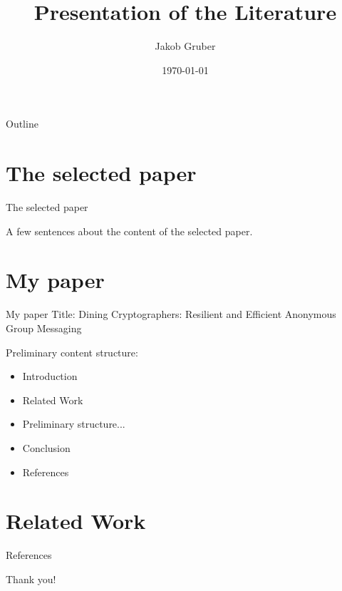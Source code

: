 \documentclass[]{beamer} %
\title{Presentation of the Literature}
\author{Jakob Gruber}
\date{\today}
\begin{document}
\maketitle

\begin{frame}[t]{Outline}
	\begin{minipage}[t][10em][t]{\linewidth}
		\tableofcontents
	\end{minipage}
\end{frame}

\section{The selected paper}

\begin{frame}{The selected paper}
    
	A few sentences about the content of the selected paper.
\end{frame}

\section{My paper}

\begin{frame}{My paper}
	Title: Dining Cryptographers: Resilient and Efficient Anonymous Group Messaging 
	
	Preliminary content structure:
	\begin{itemize}
		\item Introduction
		\item Related Work
		\item Preliminary structure...
		\item Conclusion
		\item [] References
	\end{itemize}
\end{frame}

\section{Related Work}

\begin{frame}[allowframebreaks]{References}
	\nocite{journals/corr/abs-1004-3057}
	\nocite{journals/joc/Chaum88}
	\nocite{conf/eurocrypt/GolleJ04}
	\nocite{journals/cacm/Chaum81}
	\printbibliography
\end{frame}

\begin{titleframe}
	\begin{center}
	\alert{\Large Thank you!}
	\end{center}
\end{titleframe}
\end{document}
